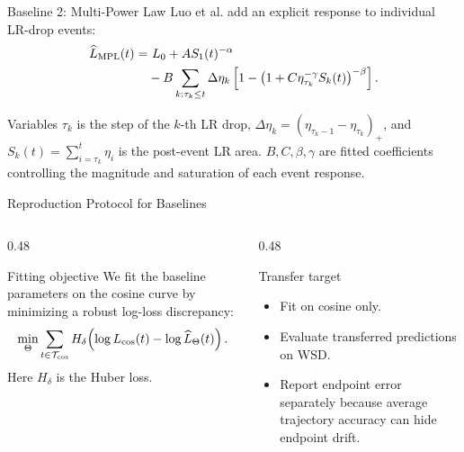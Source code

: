 \documentclass[fontset=fandol,aspectratio=169,10pt]{ctexbeamer}
\begin{document}
\begin{frame}{Baseline 2: Multi-Power Law}
  Luo et al. add an explicit response to individual LR-drop events:
  \[
  \begin{aligned}
    \widehat L_{\rm MPL}(t)=&\ L_0+A S_1(t)^{-\alpha}\\
    &-B\sum_{k:\tau_k\le t}\Delta\eta_k
      \left[1-\left(1+C\eta_{\tau_k}^{-\gamma}
      S_k(t)\right)^{-\beta}\right].
  \end{aligned}
  \]
  \begin{block}{Variables}
    \(\tau_k\) is the step of the \(k\)-th LR drop,
    \(\Delta\eta_k=(\eta_{\tau_k-1}-\eta_{\tau_k})_+\),
    and \(S_k(t)=\sum_{i=\tau_k}^{t}\eta_i\) is the post-event LR area.
    \(B,C,\beta,\gamma\) are fitted coefficients controlling the magnitude
    and saturation of each event response.
  \end{block}
\end{frame}

\begin{frame}{Reproduction Protocol for Baselines}
  \begin{columns}[T,onlytextwidth]
    \begin{column}{0.48\textwidth}
      \begin{block}{Fitting objective}
        We fit the baseline parameters on the cosine curve by minimizing a robust
        log-loss discrepancy:
        \[
          \min_\Theta\sum_{t\in\mathcal T_{\rm cos}}
          H_\delta\!\left(\log L_{\rm cos}(t)-
          \log \widehat L_\Theta(t)\right).
        \]
        Here \(H_\delta\) is the Huber loss.
      \end{block}
    \end{column}
    \begin{column}{0.48\textwidth}
      \begin{block}{Transfer target}
        \begin{itemize}
          \item Fit on cosine only.
          \item Evaluate transferred predictions on WSD.
          \item Report endpoint error separately because average trajectory
          accuracy can hide endpoint drift.
        \end{itemize}
      \end{block}
    \end{column}
  \end{columns}
\end{frame}
\end{document}
